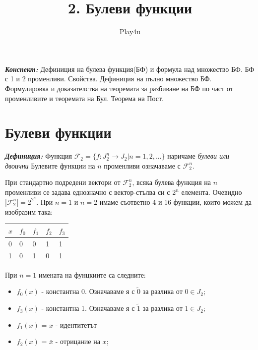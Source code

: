 \documentclass[11pt]{article} %
\title{2. Булеви функции}
\author{Play4u}
\newcommand{\italicBold}[1]{\textbf{\emph{#1}}}
\newcommand{\definition}{\italicBold{Дефиниция: }}
\newcommand{\curlies}[1]{\{#1\}}
\begin{document}
\maketitle

\italicBold{Конспект:} Дефиниция на булева функция(БФ) и формула над множество БФ. БФ с 1 и 2 променливи. Свойства. Дефиниция на пълно множество БФ. Формулировка и доказателства на теоремата за разбиване на БФ по част от променливите и теоремата на Бул. Теорема на Пост.

\section{Булеви функции}
\definition Функция $\mathcal{F}_{2} = \curlies{f:J^{n}_{2} \to J_{2} | n = 1, 2, ...}$ наричаме \textit{булеви или двоични} Булевите функции на $n$ променливи означаваме с $\mathcal{F}^{n}_{2}$. \par

При стандартно подредени вектори от $\mathcal{F}^{n}_{2}$, всяка булева функция на $n$ променливи се задава еднозначно с вектор-стълва си с $2^{n}$ елемента. Очевидно $|\mathcal{F}^{n}_{2}| = 2^{2^n}$. При $n = 1$ и $n = 2$ имаме съответно 4 и 16 функции, които можем да изобразим така: 

\begin{table}[!ht]
\centering
\begin{tabular}{|l|llll|}
\hline
$x$ & $f_{0}$ & $f_{1}$ & $f_{2}$ &  $f_{3}$\\ \hline
0 & 0 & 0 & 1 & 1  \\
1 & 0 & 1 & 0 & 1 \\ \hline
\end{tabular}
\end{table}

При $n = 1$ имената на фунцкиите са следните: \\
\begin{itemize}
	\item $f_{0}(x)$ - константна 0. Означаваме я с $\tilde{0}$ за разлика от $0 \in J_{2}$; \\
	\item $f_{3}(x)$ - константна 1. Означаваме я с $\tilde{1}$ за разлика от $1 \in J_{2}$; \\
	\item $f_{1}(x)$ = $x$ - идентитетът \\
	\item $f_{2}(x)$ = $\bar{x}$ - отрицание на $x$; 
\end{itemize} \par
\end{document}
